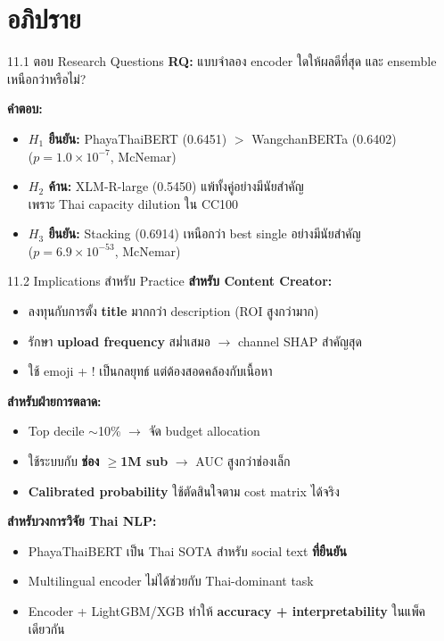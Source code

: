 \documentclass[aspectratio=169,11pt,xcolor=dvipsnames]{beamer}
\newcommand{\hl}[1]{\textcolor{kmitlOrange}{\textbf{#1}}}
\begin{document}
\section{อภิปราย}

\begin{frame}{11.1 ตอบ Research Questions}
  \textbf{RQ:} แบบจำลอง encoder ใดให้ผลดีที่สุด และ ensemble เหนือกว่าหรือไม่?
  \vspace{0.4em}

  \textbf{คำตอบ:}
  \begin{itemize}
    \item \hl{$H_1$ ยืนยัน:} PhayaThaiBERT (0.6451) $>$ WangchanBERTa (0.6402)\\
      ($p = 1.0 \times 10^{-7}$, McNemar)
    \item \hl{$H_2$ ค้าน:} XLM-R-large (0.5450) แพ้ทั้งคู่อย่างมีนัยสำคัญ\\
      เพราะ Thai capacity dilution ใน CC100
    \item \hl{$H_3$ ยืนยัน:} Stacking (0.6914) เหนือกว่า best single อย่างมีนัยสำคัญ\\
      ($p = 6.9 \times 10^{-53}$, McNemar)
  \end{itemize}
\end{frame}

\begin{frame}[shrink=8]{11.2 Implications สำหรับ Practice}
  \textbf{สำหรับ Content Creator:}
  \begin{itemize}
    \item ลงทุนกับการตั้ง \hl{title} มากกว่า description (ROI สูงกว่ามาก)
    \item รักษา \hl{upload frequency} สม่ำเสมอ $\rightarrow$ channel SHAP สำคัญสุด
    \item ใช้ emoji + ! เป็นกลยุทธ์ แต่ต้องสอดคล้องกับเนื้อหา
  \end{itemize}
  \vspace{0.4em}
  \textbf{สำหรับฝ่ายการตลาด:}
  \begin{itemize}
    \item Top decile $\sim$10\% $\rightarrow$ จัด budget allocation
    \item ใช้ระบบกับ \hl{ช่อง $\geq$1M sub} $\rightarrow$ AUC สูงกว่าช่องเล็ก
    \item \hl{Calibrated probability} ใช้ตัดสินใจตาม cost matrix ได้จริง
  \end{itemize}
  \vspace{0.4em}
  \textbf{สำหรับวงการวิจัย Thai NLP:}
  \begin{itemize}
    \item PhayaThaiBERT เป็น Thai SOTA สำหรับ social text \hl{ที่ยืนยัน}
    \item Multilingual encoder ไม่ได้ช่วยกับ Thai-dominant task
    \item Encoder + LightGBM/XGB ทำให้ \hl{accuracy + interpretability} ในแพ็คเดียวกัน
  \end{itemize}
\end{frame}
\end{document}
